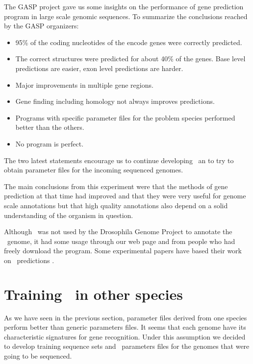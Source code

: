 The GASP project gave us some insights on the performance of gene
prediction program in large scale genomic sequences. To summarize the 
conclusions reached by the GASP organizers:

\begin{itemize}
\item 95\% of the coding nucleotides of the encode genes were
correctly predicted.

\item The correct structures were predicted for about 40\% of the
genes. Base level predictions are easier, exon level predictions are
harder.

\item Major improvements in multiple gene regions.

\item Gene finding including homology not always improves predictions.

\item Programs with specific parameter files for the problem species
performed better than the others.

\item No program is perfect.

\end{itemize}

The two latest statements encourage us to continue developing \geneid\ an
to try to obtain parameter files for the incoming sequenced genomes.

The main conclusions from this experiment were that the methods of
gene prediction at that time had improved and that they were very
useful for genome scale annotations but that high quality annotations
also depend on a solid understanding of the organism in question.


Although \geneid\ was not used by the Drosophila Genome Project to
annotate the \Dm\ genome, it had some usage through our web page
and from people who had freely download the program. Some experimental
papers have based their work on \geneid\ predictions
\citep{dunlop:2000a,castellano:2001a,beltran:2003a}.





\newpage
\section{Training \geneid\ in other species}

As we have seen in the previous section, parameter files derived from
one species perform better than generic parameters files. It seems
that each genome have its characteristic signatures for gene
recognition. Under this assumption we decided to develop training
sequence sets and \geneid\ parameters files for the genomes that were
going to be sequenced. 

